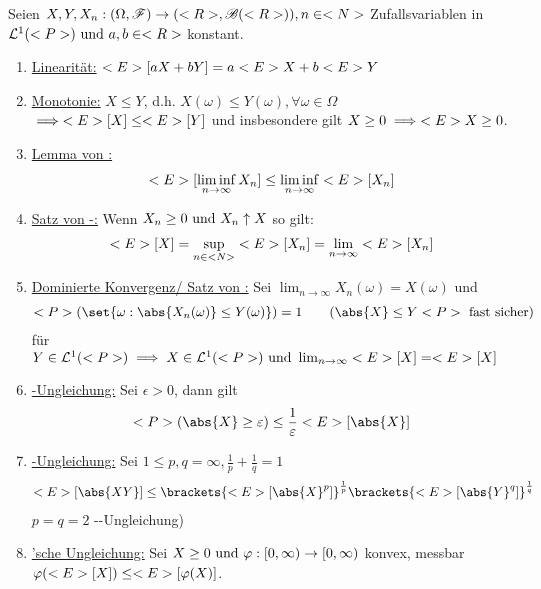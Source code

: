 \begin{proposition}
	Seien $X,Y,X_n: (\Omega,\mathscr F) \to (<R>, \mathscr{B}(<R>)), n \in <N>$ Zufallsvariablen in $\mathcal{L}^{1}(<P>)\text{ und } a,b \in <R>$ konstant.
	\begin{enumerate}
		\item \ul{Linearität:} $<E>[aX +bY] = a<E> X + b<E> Y$
		\item \ul{Monotonie:} $X \le Y$, d.h. $X(\omega) \le Y(\omega), \forall \omega \in \Omega$\\ 
		$\implies <E>[X] \le <E>[Y]$ und insbesondere gilt $X \ge 0 \implies <E> X \ge 0$.
		\item \ul{Lemma von :}
		\begin{align*}
		<E>[\liminf_{n \to \infty}X_n] \le \liminf_{n \to \infty} <E>[X_n]
		\end{align*}
		\item \ul{Satz von -:} Wenn $X_n \ge 0 \text{ und } X_n \uparrow X$ so gilt:
		\begin{align*}
		<E>[X] = \sup_{n \in <N>} <E>[X_n] = \lim_{n \to \infty} <E>[X_n]
		\end{align*}
		\item \ul{Dominierte Konvergenz/ Satz von :} Sei $\lim_{n \to \infty} X_n(\omega) = X(\omega)$ und
		\begin{align*}
		\P(\set{\omega: \abs{X_n(\omega)} \le Y(\omega)}) = 1 \qquad (\abs{X} \le Y \P \text{ fast sicher})
		\end{align*}
		für $Y \in \mathcal{L}^{1}(<P>) \implies X \in \mathcal{L}^{1}(<P>) \text{ und } \lim_{n \to \infty} <E>[X] = <E>[X]$
		\item \ul{-Ungleichung:} Sei $\epsilon > 0$, dann gilt
		\begin{align*}
		\P(\abs{X} \ge \epsilon) \le \frac{1}{\epsilon} \E[\abs{X}]
		\end{align*}
		\item \ul{-Ungleichung:} Sei $1 \le p,q = \infty, \frac{1}{p}+ \frac{1}{q} = 1$
		\begin{align*}
		\E[\abs{XY}] \le \brackets{\E[\abs{X}^p]}^{\frac{1}{p}} \brackets{\E[\abs{Y}^q]}^{\frac{1}{q}}
		\end{align*}
		$p =q =2$ --Ungleichung)
		\item \ul{'sche Ungleichung:} Sei $X \ge 0 \text{ und } \varphi: [0,\infty) \to [0,\infty)$ konvex, messbar \\
		$\varphi(<E>[X]) \le <E>[\varphi(X)]$.
	\end{enumerate}
\end{proposition}
